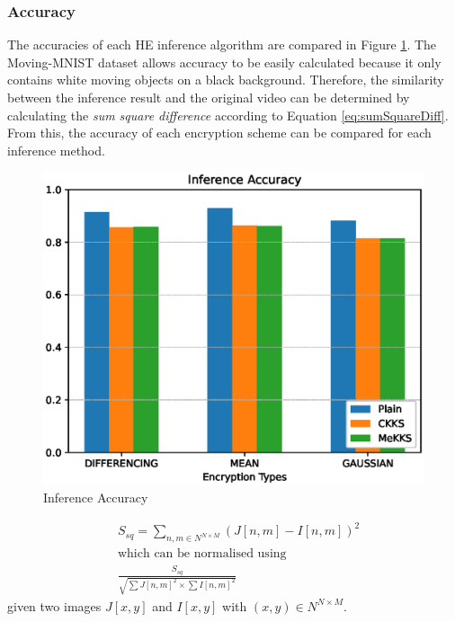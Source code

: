 \setlength{\leftskip}{0cm}
\subsubsection{Accuracy}
\setlength{\leftskip}{0.5cm}
\indent \indent
The accuracies of each HE inference algorithm are compared in Figure \ref{fig:accuracy}. The Moving-MNIST dataset allows accuracy to be easily calculated because it only contains white moving objects on a black background. Therefore, the similarity between the inference result and the original video can be determined by calculating the \textit{sum square difference} according to Equation \ref{eq:sumSquareDiff}. From this, the accuracy of each encryption scheme can be compared for each inference method.

\begin{figure}[h!]
    \centering
    \includegraphics[scale=0.8]{figures/accuracy.eps}
    \caption{Inference Accuracy}
    \label{fig:accuracy}
\end{figure}

\begin{equation}
    \label{eq:sumSquareDiff}
    \begin{split}
    &S_{sq} = \sum_{n,m \in N^{N \times M}} (J[n, m] - I[n, m])^2 \\
    &\textrm{which can be normalised using} \\
    &\frac{S_{sq}}{\sqrt{\sum J[n,m]^2 \times \sum I[n,m]^2}}
    \end{split}
\end{equation}
given two images $J[x,y]$ and $I[x,y]$ with $(x,y) \in N^{N \times M}$.

